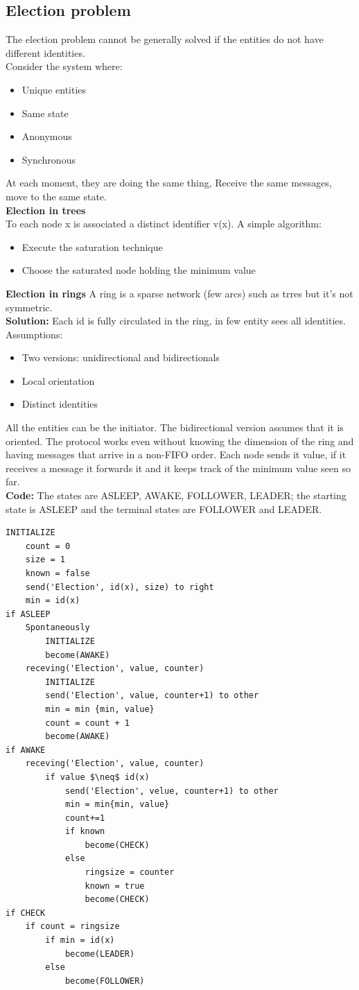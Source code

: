 \documentclass[paper=a4, fontsize=11pt]{scrartcl} %
\numberwithin{equation}{section} %
\numberwithin{figure}{section} %
\numberwithin{table}{section} %
\begin{document}
\subsection*{Election problem}
The election problem cannot be generally solved if the entities do not have different identities.\\
Consider the system where:
\begin{itemize}
\item Unique entities
\item Same state
\item Anonymous
\item Synchronous
\end{itemize}
At each moment, they are doing the same thing, Receive the same messages, move to the same state.\\
\textbf{Election in trees}\\
To each node x is associated a distinct identifier v(x). A simple algorithm:
\begin{itemize}
\item Execute the saturation technique
\item Choose the saturated node holding the minimum value
\end{itemize}
\textbf{Election in rings}
A ring is a sparse network (few arcs) such as trres but it's not symmetric. \\
\textbf{Solution:} Each id is fully circulated in the ring, in few entity sees all identities.
Assumptions:
\begin{itemize}
\item Two versions: unidirectional and bidirectionals
\item Local orientation
\item Distinct identities
\end{itemize}
All the entities can be the initiator. The bidirectional version assumes that it is oriented. The protocol works even without knowing the dimension of the ring and having messages that arrive in a non-FIFO order. Each node sends it value, if it receives a message it forwards it and it keeps track of the minimum value seen so far.\\
\textbf{Code:} The states are ASLEEP, AWAKE, FOLLOWER, LEADER; the starting state is ASLEEP and the terminal states are FOLLOWER and LEADER. 
\begin{lstlisting}
INITIALIZE
	count = 0
	size = 1
	known = false
	send('Election', id(x), size) to right
	min = id(x)
if ASLEEP
	Spontaneously
		INITIALIZE
		become(AWAKE)
	receving('Election', value, counter)
		INITIALIZE
		send('Election', value, counter+1) to other
		min = min {min, value}
		count = count + 1
		become(AWAKE)
if AWAKE
	receving('Election', value, counter)
		if value $\neq$ id(x)
			send('Election', velue, counter+1) to other
			min = min{min, value}
			count+=1
			if known 
				become(CHECK)
			else
				ringsize = counter
				known = true
				become(CHECK)
if CHECK
	if count = ringsize
		if min = id(x)
			become(LEADER)
		else
			become(FOLLOWER)										
\end{lstlisting}
\end{document}
